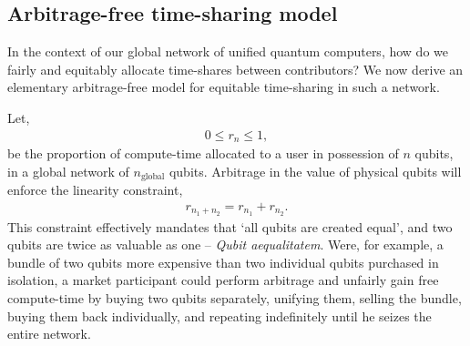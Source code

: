 \documentclass[aps, rmp, twocolumn, amsmath, amssymb, nofootinbib, superscriptaddress, longbibliography, floatfix, table-of-contents, eqsecnum]{revtex4-1}
\begin{document}
%
%

\subsection{Arbitrage-free time-sharing model}

In the context of our global network of unified quantum computers, how do we fairly and equitably allocate time-shares between contributors? We now derive an elementary arbitrage-free model for equitable time-sharing in such a network.

Let,
\begin{align}
	0\leq r_n \leq 1,
\end{align}
be the proportion of compute-time allocated to a user in possession of $n$ qubits, in a global network of $n_\text{global}$ qubits. Arbitrage in the value of physical qubits will enforce the linearity constraint,
\begin{align}
	r_{n_1+n_2} = r_{n_1} + r_{n_2}.
\end{align}
This constraint effectively mandates that `all qubits are created equal', and two qubits are twice as valuable as one -- \textit{Qubit aequalitatem}. Were, for example, a bundle of two qubits more expensive than two individual qubits purchased in isolation, a market participant could perform arbitrage and unfairly gain free compute-time by buying two qubits separately, unifying them, selling the bundle, buying them back individually, and repeating indefinitely until he seizes the entire network.
\end{document}
